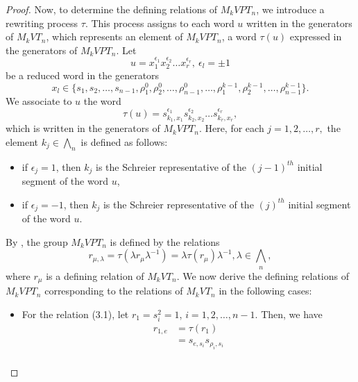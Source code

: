 \documentclass[preprint]{elsarticle}
\begin{document}
\begin{proof}
    Now, to determine the defining relations of $M_kVPT_n$, we introduce a rewriting process $\tau$. This process assigns to each word $u$ written in the generators of $M_kVT_n$, which represents an element of $M_kVPT_n$, a word $\tau(u)$ expressed in the generators of $M_kVPT_n$.
    Let \[u=x_1^{\epsilon_1}x_2^{\epsilon_2} \dots x_r^{\epsilon_r}, ~\epsilon_l=\pm1\]
    be a reduced word in the generators  
    \[ x_l \in \{s_1,s_2,\dots,s_{n-1},\rho_1^0,\rho_2^0,\dots,\rho_{n-1}^0, \dots, \rho_1^{k-1}, \rho_2^{k-1},\dots,\rho_{n-1}^{k-1} \}. \]
    We associate to $u$ the word \[ \tau(u)= s_{k_1,x_1}^{\epsilon_1} s_{k_2,x_2}^{\epsilon_2} \dots s_{k_r,x_r}^{\epsilon_r},\]
    which is written in the generators of $M_kVPT_n$.
    Here, for each $j=1,2,\dots,r,$ the element $k_j \in \bigwedge_n$ is defined as follows:
    \begin{itemize}
        \item if $\epsilon_j=1$, then $k_j$ is the Schreier representative of the $(j-1)^{th}$ initial segment of the word $u$,
        \item if $\epsilon_j=-1$, then $k_j$ is the Schreier representative of the $(j)^{th}$ initial segment of the word $u$.
    \end{itemize}
    By \cite[Theorem~2.9]{MKS}, the group $M_kVPT_n$ is defined by the relations   \[ r_{\mu,\lambda} = \tau(\lambda r_{\mu} \lambda^{-1}) = \lambda \tau(r_{\mu}) \lambda^{-1}, \lambda \in \bigwedge_n,  \] where $r_{\mu}$ is a defining relation of $M_kVT_n.$
    We now derive the defining relations of $M_kVPT_n$ corresponding to the relations of $M_kVT_n$ in the following cases:
    \begin{itemize}
        \item[i)] For the relation (3.1), let $r_1 = s_i^{2} =1$, $i=1,2,\ldots,n-1$. Then, we have
    \begin{align*}
             r_{1,e}&=\tau(r_1) \\
             &= s_{e,s_i}s_{\rho_i,s_i}\\

\end{align*}
\end{itemize}
\end{proof}
\end{document}
